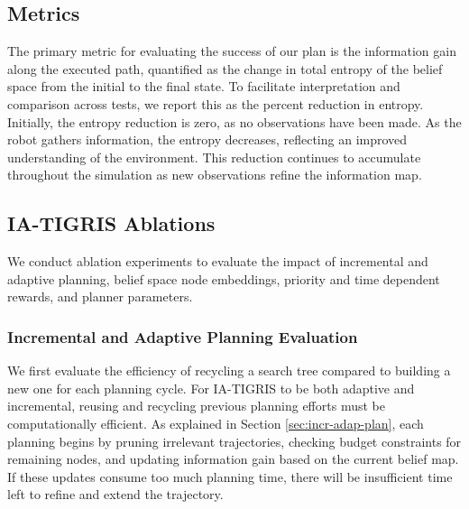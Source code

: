 \subsection{Metrics}

The primary metric for evaluating the success of our plan is the information gain along the executed path, quantified as the change in total entropy of the belief space from the initial to the final state. To facilitate interpretation and comparison across tests, we report this as the percent reduction in entropy. Initially, the entropy reduction is zero, as no observations have been made. As the robot gathers information, the entropy decreases, reflecting an improved understanding of the environment. This reduction continues to accumulate throughout the simulation as new observations refine the information map.


\subsection{IA-TIGRIS Ablations}

We conduct ablation experiments to evaluate the impact of incremental and adaptive planning, belief space node embeddings, priority and time dependent rewards, and planner parameters.

\subsubsection{Incremental and Adaptive Planning Evaluation} 


We first evaluate the efficiency of recycling a search tree compared to building a new one for each planning cycle. For IA-TIGRIS to be both adaptive and incremental, reusing and recycling previous planning efforts must be computationally efficient. As explained in Section \ref{sec:incr-adap-plan}, each planning begins by pruning irrelevant trajectories, checking budget constraints for remaining nodes, and updating information gain based on the current belief map. If these updates consume too much planning time, there will be insufficient time left to refine and extend the trajectory.

